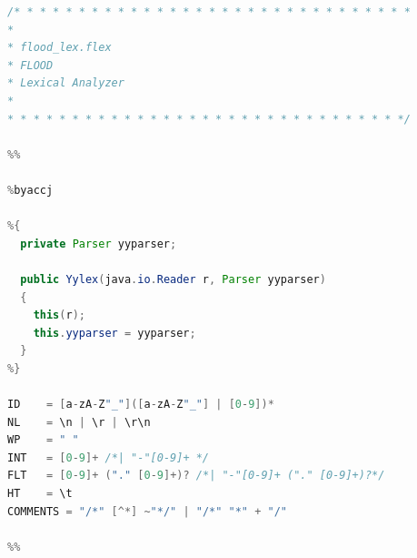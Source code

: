 \documentclass[12pt]{report}
\begin{document}
\begin{singlespace}
\begin{lstlisting}[language=Java,label=some-code,caption={flood$\_$lex.flex}]
/* * * * * * * * * * * * * * * * * * * * * * * * * * * * * * *
*
* flood_lex.flex
* FLOOD
* Lexical Analyzer
*
* * * * * * * * * * * * * * * * * * * * * * * * * * * * * * */

%%

%byaccj

%{
  private Parser yyparser;

  public Yylex(java.io.Reader r, Parser yyparser)
  {
    this(r);
    this.yyparser = yyparser;
  }
%}

ID    = [a-zA-Z"_"]([a-zA-Z"_"] | [0-9])*
NL    = \n | \r | \r\n
WP    = " "
INT   = [0-9]+ /*| "-"[0-9]+ */
FLT   = [0-9]+ ("." [0-9]+)? /*| "-"[0-9]+ ("." [0-9]+)?*/
HT    = \t
COMMENTS = "/*" [^*] ~"*/" | "/*" "*" + "/"

%%


\end{lstlisting}
\end{singlespace}
\end{document}
